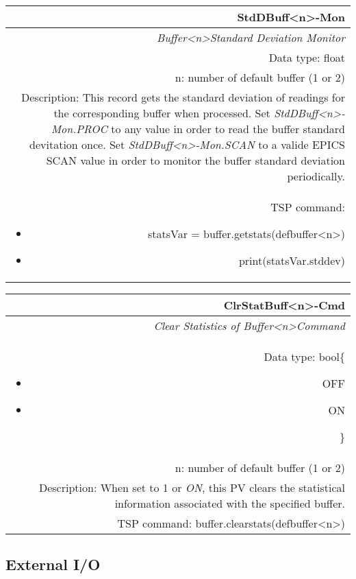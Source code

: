 \documentclass[openany]{article}
\begin{document}
		\begin{tabular}{N}
			\hline
			\bfseries StdDBuff\textless n\textgreater-Mon\label{pv:stddbuff-mon} \\ \hline
			\emph{Buffer\textless n\textgreater Standard Deviation Monitor} \\
			Data type: float \\
			n: number of default buffer (1 or 2) \\
			Description: This record gets the standard deviation of readings for the corresponding buffer when processed. Set \emph{StdDBuff\textless n\textgreater-Mon.PROC} to any value in order to read the buffer standard devitation once. Set \emph{StdDBuff\textless n\textgreater-Mon.SCAN} to a valide EPICS SCAN value in order to monitor the buffer standard deviation periodically. \\
			TSP command: \begin{itemize} \item[] statsVar = buffer.getstats(defbuffer\textless n\textgreater) \item[] print(statsVar.stddev) \end{itemize}
		\end{tabular}

		\begin{tabular}{N}
			\hline
			\bfseries ClrStatBuff\textless n\textgreater-Cmd\label{pv:clrstatbuff-cmd} \\ \hline
			\emph{Clear Statistics of Buffer\textless n\textgreater Command} \\
			Data type: bool\{\begin{itemize}[noitemsep]
				\small
				\item[] OFF
				\item[] ON
			\end{itemize}\} \\
			n: number of default buffer (1 or 2) \\
			Description: When set to 1 or \emph{ON}, this PV clears the statistical information associated with the specified buffer. \\
			TSP command: buffer.clearstats(defbuffer\textless n\textgreater)
		\end{tabular}

	\subsection{External I/O}\label{pvgroup:external-io}

		\paragraph{} %
\end{document}

